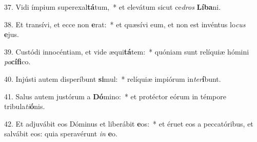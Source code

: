 37. Vidi ímpium superexal\textbf{tá}tum,~*  et elevátum sicut ce\textit{dros} \textbf{Lí}\textbf{ba}ni.\

38. Et transívi, et ecce non \textbf{e}rat:~*  et quæsívi eum, et non est invéntus lo\textit{cus} \textbf{e}jus.\

39. Custódi innocéntiam, et vide æqui\textbf{tá}tem:~*  quóniam sunt relíquiæ hómini \textit{pa}\textbf{cí}\textbf{fi}co.\

40. Injústi autem disperíbunt \textbf{si}mul:~*  relíquiæ impiórum in\textit{ter}\textbf{í}bunt.\

41. Salus autem justórum a \textbf{Dó}mino:~*  et protéctor eórum in témpore tribula\textit{ti}\textbf{ó}nis.\

42. Et adjuvábit eos Dóminus et liberábit \textbf{e}os:~*  et éruet eos a peccatóribus, et salvábit eos: quia speravérunt \textit{in} \textbf{e}o.\

